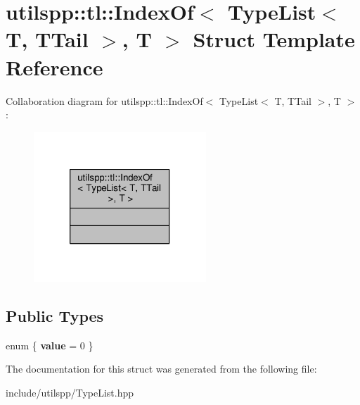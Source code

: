 \hypertarget{structutilspp_1_1tl_1_1IndexOf_3_01TypeList_3_01T_00_01TTail_01_4_00_01T_01_4}{\section{utilspp\-:\-:tl\-:\-:Index\-Of$<$ Type\-List$<$ T, T\-Tail $>$, T $>$ Struct Template Reference}
\label{structutilspp_1_1tl_1_1IndexOf_3_01TypeList_3_01T_00_01TTail_01_4_00_01T_01_4}
}


Collaboration diagram for utilspp\-:\-:tl\-:\-:Index\-Of$<$ Type\-List$<$ T, T\-Tail $>$, T $>$\-:
\nopagebreak
\begin{figure}[H]
\begin{center}
\leavevmode
\includegraphics[width=184pt]{structutilspp_1_1tl_1_1IndexOf_3_01TypeList_3_01T_00_01TTail_01_4_00_01T_01_4__coll__graph}
\end{center}
\end{figure}
\subsection*{Public Types}
\begin{DoxyCompactItemize}
\item 
enum \{ {\bfseries value} = 0
 \}
\end{DoxyCompactItemize}


The documentation for this struct was generated from the following file\-:\begin{DoxyCompactItemize}
\item 
include/utilspp/Type\-List.\-hpp\end{DoxyCompactItemize}
